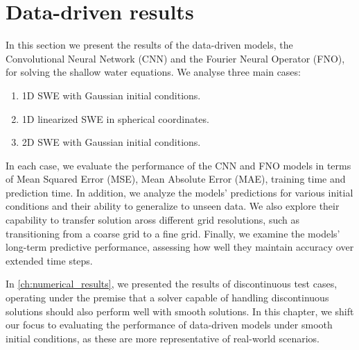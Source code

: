 \chapter{Data-driven results}\label{ch:data-driven-results}
In this section we present the results of the data-driven models, the Convolutional Neural Network (CNN) and the Fourier Neural Operator (FNO), for solving the shallow water equations.
We analyse three main cases:
\begin{enumerate}
    \item 1D SWE with Gaussian initial conditions. 
    \item 1D linearized SWE in spherical coordinates.
    \item 2D SWE with Gaussian initial conditions.
\end{enumerate}
In each case, we evaluate the performance of the CNN and FNO models in terms of Mean Squared Error (MSE), Mean Absolute Error (MAE), training time and prediction time.
In addition, we analyze the models' predictions for various initial conditions and their ability to generalize to unseen data.
We also explore their capability to transfer solution aross different grid resolutions, such as transitioning from a coarse grid to a fine grid.
Finally, we examine the models' long-term predictive performance, assessing how well they maintain accuracy over extended time steps.

In \autoref{ch:numerical_results}, we presented the results of discontinuous test cases, operating under the premise that a solver capable of handling discontinuous solutions should also perform well with smooth solutions.
In this chapter, we shift our focus to evaluating the performance of data-driven models under smooth initial conditions, as these are more representative of real-world scenarios.

